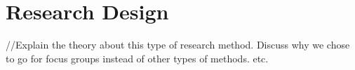 \chapter{Research Design}
//Explain the theory about this type of research method. Discuss why we chose to go for focus groups instead of other types of methods. etc. 

